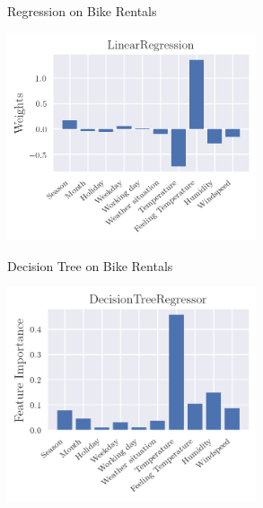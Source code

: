 \documentclass[11pt,compress,t,notes=noshow, xcolor=table]{beamer}
\begin{document}
    \begin{vbframe}{Regression on Bike Rentals}
        
        \centering
        \includegraphics[width=0.55\textwidth]{figure/lin_bikesharing.png}        

    \end{vbframe}
    
    \begin{vbframe}{Decision Tree on Bike Rentals}
        
        \centering
        \includegraphics[width=0.55\textwidth]{figure/dt_bike_sharing.png}        

    \end{vbframe}
    
\end{document}
